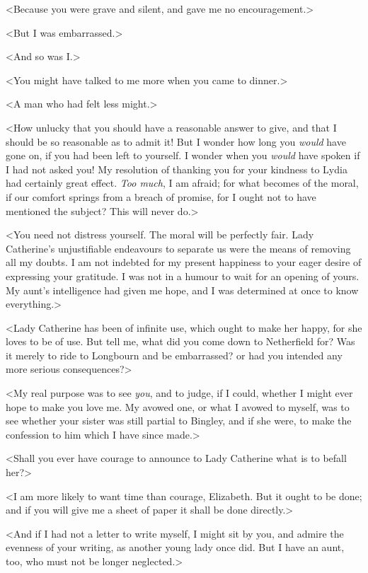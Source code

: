 <Because you were grave and silent, and gave me no encouragement.>

<But I was embarrassed.>

<And so was I\@.>

<You might have talked to me more when you came to dinner.>

<A man who had felt less might.>

<How unlucky that you should have a reasonable answer to give, and that I should be so reasonable as to admit it! But I wonder how long you \textit{would} have gone on, if you had been left to yourself. I wonder when you \textit{would} have spoken if I had not asked you! My resolution of thanking you for your kindness to Lydia had certainly great effect. \textit{Too much}, I am afraid; for what becomes of the moral, if our comfort springs from a breach of promise, for I ought not to have mentioned the subject? This will never do.>

<You need not distress yourself. The moral will be perfectly fair. Lady Catherine's unjustifiable endeavours to separate us were the means of removing all my doubts. I am not indebted for my present happiness to your eager desire of expressing your gratitude. I was not in a humour to wait for an opening of yours. My aunt's intelligence had given me hope, and I was determined at once to know everything.>

<Lady Catherine has been of infinite use, which ought to make her happy, for she loves to be of use. But tell me, what did you come down to Netherfield for? Was it merely to ride to Longbourn and be embarrassed? or had you intended any more serious consequences?>

<My real purpose was to see \textit{you}, and to judge, if I could, whether I might ever hope to make you love me. My avowed one, or what I avowed to myself, was to see whether your sister was still partial to Bingley, and if she were, to make the confession to him which I have since made.>

<Shall you ever have courage to announce to Lady Catherine what is to befall her?>

<I am more likely to want time than courage, Elizabeth. But it ought to be done; and if you will give me a sheet of paper it shall be done directly.>

<And if I had not a letter to write myself, I might sit by you, and admire the evenness of your writing, as another young lady once did. But I have an aunt, too, who must not be longer neglected.>

